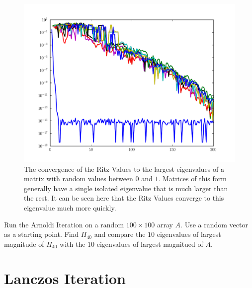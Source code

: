 \begin{figure}
\includegraphics[width=\textwidth]{rand_vals_conv.pdf}
\caption{The convergence of the Ritz Values to the largest eigenvalues of a matrix with random values between $0$ and $1$.
Matrices of this form generally have a single isolated eigenvalue that is much larger than the rest.
It can be seen here that the Ritz Values converge to this eigenvalue much more quickly.}
\label{fig:arnoldi_random_val_conv}
\end{figure}

\begin{problem}
Run the Arnoldi Iteration on a random $100 \times 100$ array $A$.
Use a random vector as a starting point.
Find $H_{40}$ and compare the $10$ eigenvalues of largest magnitude of $H_{40}$ with the $10$ eigenvalues of largest magnitued of $A$.
\end{problem}



\section*{Lanczos Iteration}



